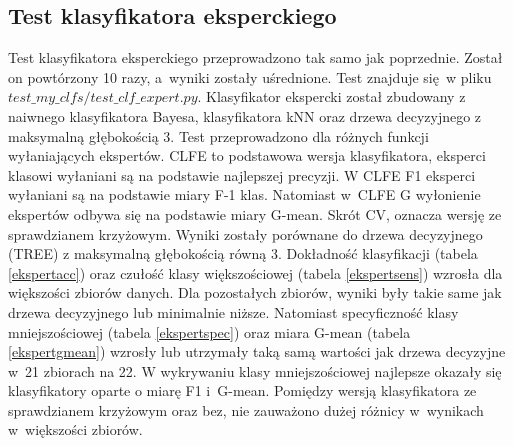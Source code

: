 \subsection{Test klasyfikatora eksperckiego}
Test klasyfikatora eksperckiego przeprowadzono tak samo jak poprzednie. Został on powtórzony 10 razy, a~wyniki zostały uśrednione. Test znajduje się w pliku $test\_my\_clfs/test\_clf\_expert.py$. Klasyfikator ekspercki został zbudowany z naiwnego klasyfikatora Bayesa, klasyfikatora kNN oraz drzewa decyzyjnego z maksymalną głębokością 3. Test przeprowadzono dla różnych funkcji wyłaniających ekspertów. CLFE to podstawowa wersja klasyfikatora, eksperci klasowi wyłaniani są na podstawie najlepszej precyzji. W CLFE F1 eksperci wyłaniani są na podstawie miary F-1 klas. Natomiast w~CLFE G wyłonienie ekspertów odbywa się na podstawie miary G-mean. Skrót CV, oznacza wersję ze sprawdzianem krzyżowym. Wyniki zostały porównane do drzewa decyzyjnego (TREE) z maksymalną głębokością równą 3. Dokładność klasyfikacji (tabela \ref{ekspertacc}) oraz czułość klasy większościowej (tabela \ref{ekspertsens}) wzrosła dla większości zbiorów danych. Dla pozostałych zbiorów, wyniki były takie same jak drzewa decyzyjnego lub minimalnie niższe. Natomiast specyficzność klasy mniejszościowej (tabela \ref{ekspertspec}) oraz miara G-mean (tabela \ref{ekspertgmean}) wzrosły lub utrzymały taką samą wartości jak drzewa decyzyjne w~21 zbiorach na 22. W wykrywaniu klasy mniejszościowej najlepsze okazały się klasyfikatory oparte o miarę F1 i~G-mean. Pomiędzy wersją klasyfikatora ze sprawdzianem krzyżowym oraz bez, nie zauważono dużej różnicy w~wynikach w~większości zbiorów.
